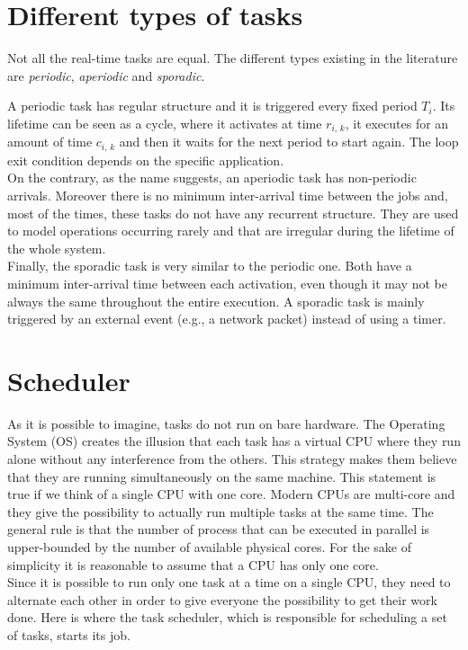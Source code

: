 \section{Different types of tasks}
Not all the real-time tasks are equal. The different types existing in
the literature are \emph{periodic}, \emph{aperiodic} and \emph{sporadic}.

A periodic task has regular structure
and it is triggered every fixed period \( T_{i} \). Its lifetime can be seen as
a cycle, where it activates at time \( r_{i,\,k} \), it executes for an amount 
of time \( c_{i,\,k} \) and then it waits for the next period to start again.
The loop exit condition depends on the specific application.\\
On the contrary, as the name suggests, an aperiodic task has non-periodic arrivals.
Moreover there is no minimum inter-arrival time between the jobs and,
most of the times, these tasks do not have any recurrent structure. They are used
to model operations occurring rarely and that are irregular during the lifetime
of the whole system.\\
Finally, the sporadic task is very similar to the periodic one. Both have a minimum
inter-arrival time between each activation, even though it may not be always the
same throughout the entire execution. A sporadic task is mainly triggered by an
external event (e.g., a network packet) instead of using a timer.


\section{Scheduler} \label{sec:scheduler}
As it is possible to imagine, tasks do not run on bare hardware.
The Operating System (OS) creates the illusion that each task has a virtual CPU
where they run alone without any interference from the others.
This strategy makes them believe that they are running simultaneously on the same
machine. This statement is true if we think of a single CPU with one core. Modern
CPUs are multi-core and they give the possibility to actually run multiple tasks
at the same time. The general rule is that the number of process that can be
executed in parallel is upper-bounded by the number of available physical cores.
For the sake of simplicity it is reasonable to assume that a CPU has only one core.\\
Since it is possible to run only one task at a time on a single CPU, they need
to alternate each other in order to give everyone the possibility to get their
work done. Here is where the task scheduler, which is responsible for
scheduling a set of tasks, starts its job.

